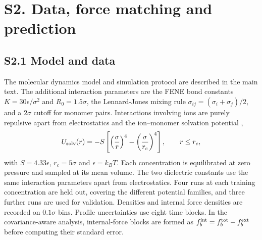 \section*{S2. Data, force matching and prediction}

\subsection*{S2.1 Model and data}
The molecular dynamics model and simulation protocol are described in the main text. The additional interaction parameters are the FENE bond constants $K=30\epsilon/\sigma^2$ and $R_0=1.5\sigma$, the Lennard-Jones mixing rule $\sigma_{ij}=(\sigma_i+\sigma_j)/2$, and a $2\sigma$ cutoff for monomer pairs. Interactions involving ions are purely repulsive apart from electrostatics and the ion--monomer solvation potential \cite{tsamopoulos2024ion,shen2020ion},
\[
U_{\rm solv}(r)=-S\left[\left(\frac{\sigma}{r}\right)^4-\left(\frac{\sigma}{r_c}\right)^4\right],\qquad r\le r_c,
\]
with $S=4.33\epsilon$, $r_c=5\sigma$ and $\epsilon=k_BT$. Each concentration is equilibrated at zero pressure and sampled at its mean volume. The two dielectric constants use the same interaction parameters apart from electrostatics.
Four runs at each training concentration are held out, covering the different potential families, and three further runs are used for validation. 
Densities and internal force densities are recorded on $0.1\sigma$ bins. Profile uncertainties use eight time blocks. In the covariance-aware analysis, internal-force blocks are formed as $f_b^{\rm int}=f_b^{\rm tot}-f_b^{\rm ext}$ before computing their standard error.

